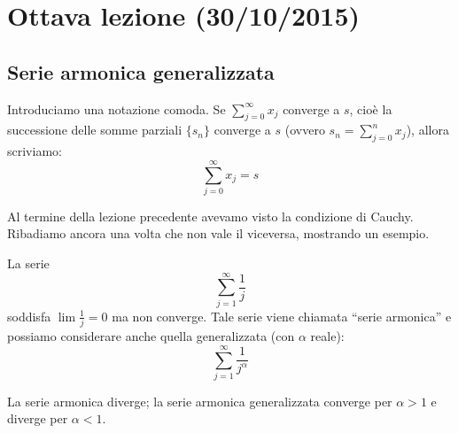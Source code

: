 \chapter{Ottava lezione (30/10/2015)}

\section{Serie armonica generalizzata}

Introduciamo una notazione comoda. Se $\sum_{j=0}^\infty x_j$ converge a $s$, cioè la successione delle somme parziali $\{s_n\}$ converge a $s$ (ovvero $s_n = \sum_{j=0}^n x_j$), allora scriviamo:
\begin{equation*}
\sum_{j=0}^\infty x_j = s
\end{equation*}

Al termine della lezione precedente avevamo visto la condizione di Cauchy. Ribadiamo ancora una volta che non vale il viceversa, mostrando un esempio.

\begin{example}
La serie
\begin{equation*}
\sum_{j=1}^\infty \frac{1}{j}
\end{equation*}
soddisfa $\lim \frac{1}{j} = 0$ ma non converge. Tale serie viene chiamata ``serie armonica'' e possiamo considerare anche quella generalizzata (con $\alpha$ reale):
\begin{equation*}
\sum_{j=1}^\infty \frac{1}{j^\alpha}
\end{equation*}
\end{example}

\begin{theorem}
La serie armonica diverge; la serie armonica generalizzata converge per $\alpha > 1$ e diverge per $\alpha < 1$.
\end{theorem}

